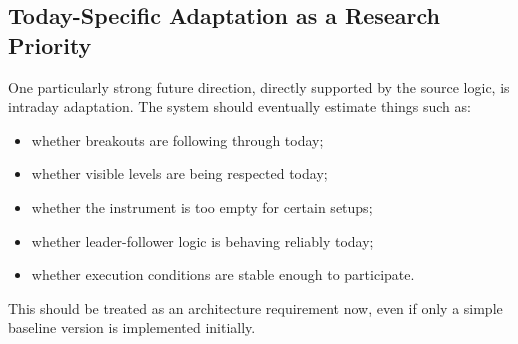 \subsection{Today-Specific Adaptation as a Research Priority}

One particularly strong future direction, directly supported by the source logic, is intraday adaptation.
The system should eventually estimate things such as:
\begin{itemize}
  \item whether breakouts are following through today;
  \item whether visible levels are being respected today;
  \item whether the instrument is too empty for certain setups;
  \item whether leader-follower logic is behaving reliably today;
  \item whether execution conditions are stable enough to participate.
\end{itemize}

This should be treated as an architecture requirement now, even if only a simple baseline version is implemented initially.
